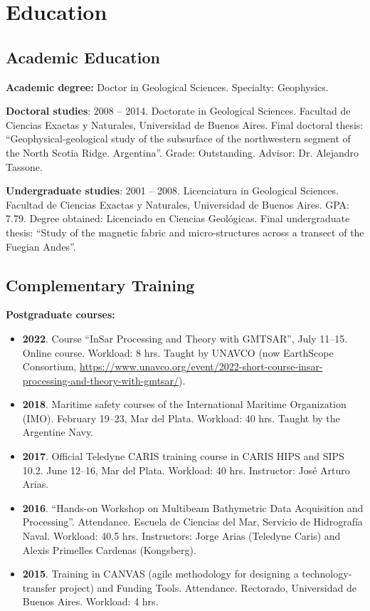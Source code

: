 \documentclass[11pt, a4paper]{article}
\begin{document}
\section{Education}

\subsection{Academic Education}

\textbf{Academic degree:} Doctor in Geological Sciences. Specialty: Geophysics.

\textbf{Doctoral studies}: 2008 – 2014. Doctorate in Geological Sciences. Facultad de Ciencias Exactas y Naturales, Universidad de Buenos Aires. Final doctoral thesis: “Geophysical-geological study of the subsurface of the northwestern segment of the North Scotia Ridge. Argentina”. Grade: Outstanding. Advisor: Dr. Alejandro Tassone.

\textbf{Undergraduate studies}: 2001 – 2008. Licenciatura in Geological Sciences. Facultad de Ciencias Exactas y Naturales, Universidad de Buenos Aires. GPA: 7.79. Degree obtained: Licenciado en Ciencias Geológicas. Final undergraduate thesis: “Study of the magnetic fabric and micro-structures across a transect of the Fuegian Andes”.

\subsection{Complementary Training}

\textbf{Postgraduate courses:}

\begin{itemize}
  \item \textbf{2022}. Course “InSar Processing and Theory with GMTSAR”, July 11--15. Online course. Workload: 8 hrs. Taught by UNAVCO (now EarthScope Consortium, \url{https://www.unavco.org/event/2022-short-course-insar-processing-and-theory-with-gmtsar/}).
  \item \textbf{2018}. Maritime safety courses of the International Maritime Organization (IMO). February 19--23, Mar del Plata. Workload: 40 hrs. Taught by the Argentine Navy.
  \item \textbf{2017}. Official Teledyne CARIS training course in CARIS HIPS and SIPS 10.2. June 12--16, Mar del Plata. Workload: 40 hrs. Instructor: José Arturo Arias.
  \item \textbf{2016}. “Hands-on Workshop on Multibeam Bathymetric Data Acquisition and Processing”. Attendance. Escuela de Ciencias del Mar, Servicio de Hidrografía Naval. Workload: 40.5 hrs. Instructors: Jorge Arias (Teledyne Caris) and Alexis Primelles Cardenas (Kongsberg).
  \item \textbf{2015}. Training in CANVAS (agile methodology for designing a technology-transfer project) and Funding Tools. Attendance. Rectorado, Universidad de Buenos Aires. Workload: 4 hrs.
\end{itemize}
\end{document}

